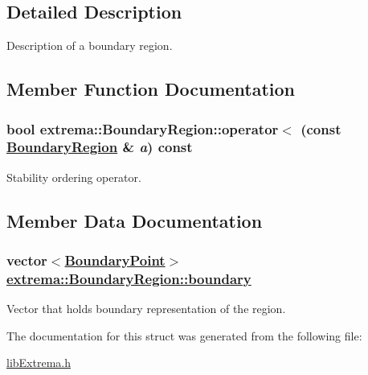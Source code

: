 \subsection{Detailed Description}
Description of a boundary region. 



\subsection{Member Function Documentation}
\hypertarget{structextrema_1_1BoundaryRegion_db707294ab50792ab4c4c1c418337f4e}{
\subsubsection[operator$<$]{\setlength{\rightskip}{0pt plus 5cm}bool extrema::Boundary\-Region::operator$<$ (const \hyperlink{structextrema_1_1BoundaryRegion}{Boundary\-Region} \& {\em a}) const}}
\label{structextrema_1_1BoundaryRegion_db707294ab50792ab4c4c1c418337f4e}


Stability ordering operator. 



\subsection{Member Data Documentation}
\hypertarget{structextrema_1_1BoundaryRegion_ead102bfcfdc1d8907632b71edd2f6e6}{
\subsubsection[boundary]{\setlength{\rightskip}{0pt plus 5cm}vector$<$\hyperlink{structextrema_1_1BoundaryPoint}{Boundary\-Point}$>$ \hyperlink{structextrema_1_1BoundaryRegion_ead102bfcfdc1d8907632b71edd2f6e6}{extrema::Boundary\-Region::boundary}}}
\label{structextrema_1_1BoundaryRegion_ead102bfcfdc1d8907632b71edd2f6e6}


Vector that holds boundary representation of the region. 



The documentation for this struct was generated from the following file:\begin{CompactItemize}
\item 
\hyperlink{libExtrema_8h}{lib\-Extrema.h}\end{CompactItemize}
